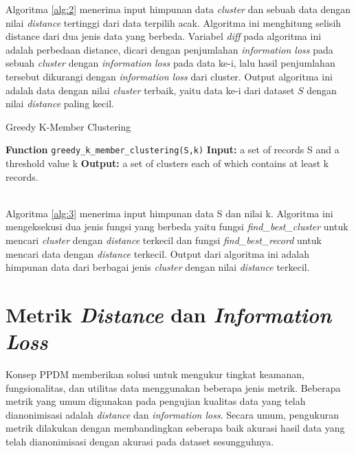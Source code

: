 Algoritma \ref{alg:2} menerima input himpunan data \textit{cluster} dan sebuah data dengan nilai \textit{distance} tertinggi dari data terpilih acak. Algoritma ini menghitung selisih distance dari dua jenis data yang berbeda. Variabel \textit{diff} pada algoritma ini adalah perbedaan distance, dicari dengan penjumlahan \textit{information loss} pada sebuah \textit{cluster} dengan \textit{information loss} pada data ke-i, lalu hasil penjumlahan tersebut dikurangi dengan \textit{information loss} dari {cluster}. Output algoritma ini adalah data dengan nilai \textit{cluster} terbaik, yaitu data ke-i dari dataset $S$ dengan nilai \textit{distance} paling kecil.

\begin{algorithm}[H]
  \caption{Greedy K-Member Clustering}		 \label{alg:3}
  \begin{algorithmic}[1]
  \State \textbf{Function} \texttt{greedy\_k\_member\_clustering(S,k)}
  \State \textbf{Input:} a set of records S and a threshold value k
  \State \textbf{Output:} a set of clusters each of which contains at least k records.
  \\
  \EndIf
  \\
  	\EndWhile
  \EndWhile
  \EndWhile
  \end{algorithmic}
\end{algorithm}

Algoritma \ref{alg:3} menerima input himpunan data S dan nilai k. Algoritma ini mengeksekusi dua jenis fungsi yang berbeda yaitu fungsi \textit{find\_best\_cluster} untuk mencari \textit{cluster} dengan \textit{distance} terkecil dan fungsi \textit{find\_best\_record} untuk mencari data dengan \textit{distance} terkecil. Output dari algoritma ini adalah himpunan data dari berbagai jenis \textit{cluster} dengan nilai \textit{distance} terkecil.


\section{Metrik \textit{Distance} dan \textit{Information Loss}} 
\label{theory:dist,il,cf}
Konsep PPDM memberikan solusi untuk mengukur tingkat keamanan, fungsionalitas, dan utilitas data menggunakan beberapa jenis metrik.  Beberapa metrik yang umum digunakan pada pengujian kualitas data yang telah dianonimisasi adalah \textit{distance} dan \textit{information loss}. Secara umum, pengukuran metrik dilakukan dengan membandingkan seberapa baik akurasi hasil data yang telah dianonimisasi dengan akurasi pada dataset sesungguhnya. 

